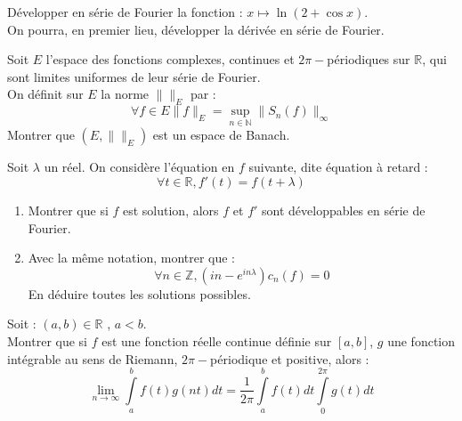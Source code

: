 \begin{exer}
Développer en série de Fourier la fonction : $x \mapsto \ln (2 + \cos x)$.\\
On pourra, en premier lieu, développer la dérivée en série de Fourier.
\end{exer}

\begin{exer}
Soit $E$ l'espace des fonctions complexes, continues et $2\pi-$périodiques sur $\mathbb{R}$, qui sont limites uniformes de leur série de Fourier.\\
On définit sur $E$ la norme $\| \|_E$ par :
\[\forall f \in E \|f\| _E = \sup\limits_{n \in \mathbb{N}} \| S_n(f) \|_{\infty}\]
Montrer que $(E , \| \|_E)$ est un espace de Banach.
\end{exer}

\begin{exer}
Soit $\lambda$ un réel. On considère l'équation en $f$ suivante, dite équation à retard :\[\forall t \in \mathbb{R} , f'(t) = f(t + \lambda)\]
\begin{enumerate}
\item Montrer que si $f$ est solution, alors $f$ et $f'$ sont développables en série de Fourier.
\item Avec la même notation, montrer que :\[\forall n \in \mathbb{Z} , (in - e^{in \lambda})c_n(f) = 0\]
En déduire toutes les solutions possibles.
\end{enumerate}
\end{exer}

\begin{exer}
Soit : $(a,b) \in \mathbb{R}$ , $a<b$.\\
Montrer que si $f$ est une fonction réelle continue définie sur $[a,b]$, %
$g$ une fonction intégrable au sens de Riemann, $2\pi -$périodique et positive, alors :
\[\lim\limits_{n \rightarrow \infty} \int\limits_a^b f(t)g(nt) dt = \frac{1}{2\pi} \int\limits_a^b f(t) dt \int\limits_0^{2\pi} g(t) dt\]
\end{exer}